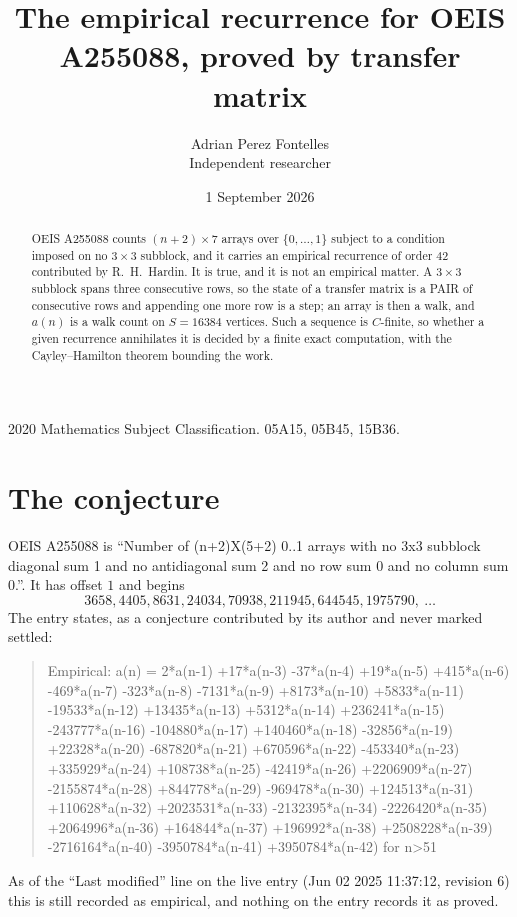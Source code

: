 \documentclass[11pt,a4paper]{article}
\title{The empirical recurrence for OEIS A255088, proved by transfer matrix}
\author{Adrian Perez Fontelles\\ \small Independent researcher}
\date{1 September 2026}
\theoremstyle{plain}
\theoremstyle{definition}
\begin{document}
\maketitle

\begin{abstract}
OEIS A255088 counts $(n+2)\times7$ arrays over $\{0,\dots,1\}$ subject to a condition imposed on
no $3\times3$ subblock, and it carries an empirical recurrence of order $42$
contributed by R.~H.~Hardin. It is true, and it is not an empirical matter. A $3\times3$
subblock spans three consecutive rows, so the state of a transfer matrix is a PAIR of
consecutive rows and appending one more row is a step; an array is then a walk, and
$a(n)$ is a walk count on $S=16384$ vertices. Such a sequence is $C$-finite, so whether a given
recurrence annihilates it is decided by a finite exact computation, with the Cayley--Hamilton
theorem bounding the work.
\end{abstract}

\noindent\small 2020 Mathematics Subject Classification. 05A15, 05B45, 15B36.\normalsize

\section{The conjecture}

OEIS A255088 is ``Number of (n+2)X(5+2) 0..1 arrays with no 3x3 subblock diagonal sum 1 and no antidiagonal sum 2 and no row sum 0 and no column sum 0.''. It has offset $1$ and begins
\[
3658, 4405, 8631, 24034, 70938, 211945, 644545, 1975790,\ \dots
\]
The entry states, as a conjecture contributed by its author and never marked settled:
\begin{quote}
Empirical: a(n) = 2*a(n-1) +17*a(n-3) -37*a(n-4) +19*a(n-5) +415*a(n-6) -469*a(n-7) -323*a(n-8) -7131*a(n-9) +8173*a(n-10) +5833*a(n-11) -19533*a(n-12) +13435*a(n-13) +5312*a(n-14) +236241*a(n-15) -243777*a(n-16) -104880*a(n-17) +140460*a(n-18) -32856*a(n-19) +22328*a(n-20) -687820*a(n-21) +670596*a(n-22) -453340*a(n-23) +335929*a(n-24) +108738*a(n-25) -42419*a(n-26) +2206909*a(n-27) -2155874*a(n-28) +844778*a(n-29) -969478*a(n-30) +124513*a(n-31) +110628*a(n-32) +2023531*a(n-33) -2132395*a(n-34) -2226420*a(n-35) +2064996*a(n-36) +164844*a(n-37) +196992*a(n-38) +2508228*a(n-39) -2716164*a(n-40) -3950784*a(n-41) +3950784*a(n-42) for n>51
\end{quote}
As of the ``Last modified'' line on the live entry (Jun 02 2025 11:37:12, revision 6) this is still
recorded as empirical, and nothing on the entry records it as proved.
\end{document}
